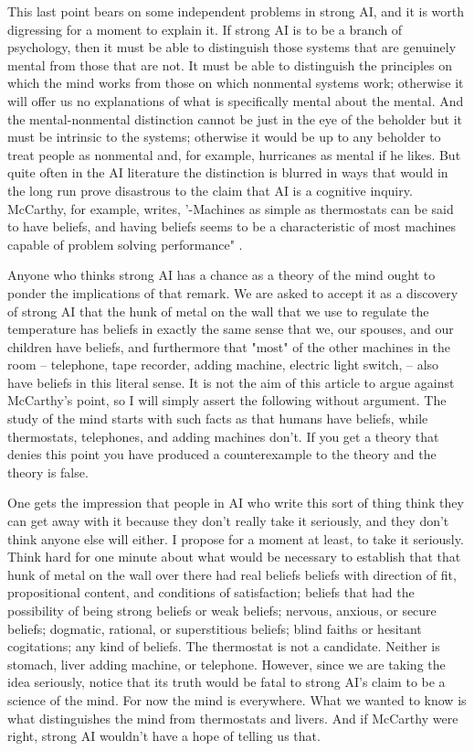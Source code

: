 This last point bears on some independent problems in strong AI, and it is worth digressing for a moment to
explain it. If strong AI is to be a branch of psychology, then it must be able to distinguish those systems that are
genuinely mental from those that are not. It must be able to distinguish the principles on which the mind works
from those on which nonmental systems work; otherwise it will offer us no explanations of what is specifically
mental about the mental. And the mental-nonmental distinction cannot be just in the eye of the beholder but it
must be intrinsic to the systems; otherwise it would be up to any beholder to treat people as nonmental and, for
example, hurricanes as mental if he likes. But quite often in the AI literature the distinction is blurred in ways
that would in the long run prove disastrous to the claim that AI is a cognitive inquiry. McCarthy, for example,
writes, '-Machines as simple as thermostats can be said to have beliefs, and having beliefs seems to be a
characteristic of most machines capable of problem solving performance" \autocite{McCarthy1}.

Anyone who thinks strong AI has a chance as a theory of the mind ought to ponder the implications of that
remark. We are asked to accept it as a discovery of strong AI that the hunk of metal on the wall that we use to
regulate the temperature has beliefs in exactly the same sense that we, our spouses, and our children have
beliefs, and furthermore that "most" of the other machines in the room -- telephone, tape recorder, adding
machine, electric light switch, -- also have beliefs in this literal sense. It is not the aim of this article to argue
against McCarthy's point, so I will simply assert the following without argument. The study of the mind starts
with such facts as that humans have beliefs, while thermostats, telephones, and adding machines don't. If you get
a theory that denies this point you have produced a counterexample to the theory and the theory is false.

One gets the impression that people in AI who write this sort of thing think they can get away with it because
they don't really take it seriously, and they don't think anyone else will either. I propose for a moment at least, to
take it seriously. Think hard for one minute about what would be necessary to establish that that hunk of metal
on the wall over there had real beliefs beliefs with direction of fit, propositional content, and conditions of
satisfaction; beliefs that had the possibility of being strong beliefs or weak beliefs; nervous, anxious, or secure
beliefs; dogmatic, rational, or superstitious beliefs; blind faiths or hesitant cogitations; any kind of beliefs. The
thermostat is not a candidate. Neither is stomach, liver adding machine, or telephone. However, since we are
taking the idea seriously, notice that its truth would be fatal to strong AI's claim to be a science of the mind. For
now the mind is everywhere. What we wanted to know is what distinguishes the mind from thermostats and
livers. And if McCarthy were right, strong AI wouldn't have a hope of telling us that.

